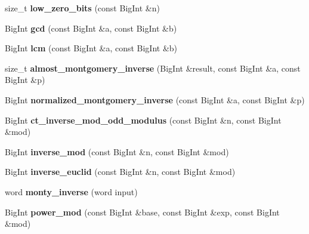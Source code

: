 \begin{DoxyCompactItemize}
\item 
\mbox{\label{namespace_botan_a43ab48f5e53973460726471b57bf1742}} 
size\+\_\+t {\bfseries low\+\_\+zero\+\_\+bits} (const Big\+Int \&n)
\item 
\mbox{\label{namespace_botan_ab3a7ea8e61510d23d2eab11dd88c0e24}} 
Big\+Int {\bfseries gcd} (const Big\+Int \&a, const Big\+Int \&b)
\item 
\mbox{\label{namespace_botan_a3440b6ae2e3737516760560a668e200d}} 
Big\+Int {\bfseries lcm} (const Big\+Int \&a, const Big\+Int \&b)
\item 
\mbox{\label{namespace_botan_ae560deeabf1e0fd634a150b90f0bfaf2}} 
size\+\_\+t {\bfseries almost\+\_\+montgomery\+\_\+inverse} (Big\+Int \&result, const Big\+Int \&a, const Big\+Int \&p)
\item 
\mbox{\label{namespace_botan_ac72ef3fd852fc2235bb873a1b107316c}} 
Big\+Int {\bfseries normalized\+\_\+montgomery\+\_\+inverse} (const Big\+Int \&a, const Big\+Int \&p)
\item 
\mbox{\label{namespace_botan_a9eab400e6f4197af47cd7916177182a7}} 
Big\+Int {\bfseries ct\+\_\+inverse\+\_\+mod\+\_\+odd\+\_\+modulus} (const Big\+Int \&n, const Big\+Int \&mod)
\item 
\mbox{\label{namespace_botan_ae4b73405806a0c8078b7f06aa7eea9bc}} 
Big\+Int {\bfseries inverse\+\_\+mod} (const Big\+Int \&n, const Big\+Int \&mod)
\item 
\mbox{\label{namespace_botan_a01f4bf762f257c84ecec1ab8fd9fcf8e}} 
Big\+Int {\bfseries inverse\+\_\+euclid} (const Big\+Int \&n, const Big\+Int \&mod)
\item 
\mbox{\label{namespace_botan_afa737eba328adb36d77da6af925bbbc9}} 
word {\bfseries monty\+\_\+inverse} (word input)
\item 
\mbox{\label{namespace_botan_a0d6591d0e9bc0c4c75c46032fe3aa048}} 
Big\+Int {\bfseries power\+\_\+mod} (const Big\+Int \&base, const Big\+Int \&exp, const Big\+Int \&mod)

\end{DoxyCompactItemize}
